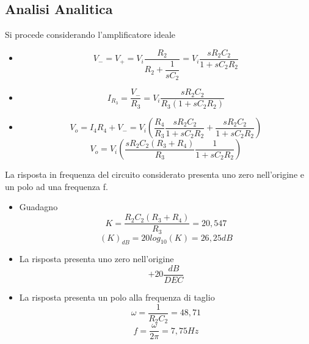 \subsection{Analisi Analitica}\label{subsec:analisiAnalitica}
Si procede considerando l'amplificatore ideale
\begin{itemize}
\item 
    \begin{equation}\label{eq:eqMorsettiAmplificatore}
    V_{-} = V_{+} = V_{i} \dfrac{R_{2}}{R_{2} + \dfrac{1}{sC_{2}}} = V_{i} \dfrac{sR_{2}C_{2}}{1 + sC_{2}R_{2}}
    \end{equation}
\item 
    \begin{equation}\label{eq:eqCorrenteR3}
    I_{R_{3}} = \dfrac{V_{-}}{R_{3}} = V_{i} \dfrac{sR_{2}C_{2}}{R_{3} (1 + sC_{2}R_{2})}
    \end{equation}
\item
    \begin{equation}\label{eq:eqTensioneUscita1}
    V_{o} = I_{4} R_{4} + V_{-} = V_{i} ( \dfrac{R_{4}}{R_{3}} \dfrac{sR_{2}C_{2}}{1 + sC_{2}R_{2}} + \dfrac{sR_{2}C_{2}}{1 + sC_{2}R_{2}} )
    \end{equation}
    \begin{equation}\label{eq:eqTensioneUscita2}
    V_{o} = V_{i} ( \dfrac{sR_{2}C_{2} (R_{3}+R_{4})}{R_{3}} \dfrac{1}{1 + sC_{2}R_{2}}  )
    \end{equation}
\end{itemize}
La risposta in frequenza del circuito considerato presenta uno zero nell'origine e un polo ad una frequenza f.
\begin{itemize}
\item 
    Guadagno \begin{equation}\label{eq:eqGuadagno}
    K = \dfrac{R_{2}C_{2} (R_{3}+R_{4})}{R_{3}} = 20,547
    \end{equation}
    \begin{equation}\label{eq:eqGuadagnoDecibel}
    (K)_{dB} = 20 log_{10} (K) = 26,25 dB
    \end{equation}
\item 
    La risposta presenta uno zero nell'origine
    \begin{equation}\label{eq:eqPoloOrigine}
    +20 \dfrac{dB}{DEC}
    \end{equation}
\item
    La risposta presenta un polo alla frequenza di taglio
    \begin{equation}\label{eq:eqPulsazioneTaglio}
    \omega = \dfrac{1}{R_{2}C_{2}} = 48,71
    \end{equation}
    \begin{equation}\label{eq:eqFrequenzaTaglio}
    f = \dfrac{\omega}{2\pi} = 7,75 Hz
    \end{equation}
\end{itemize}

